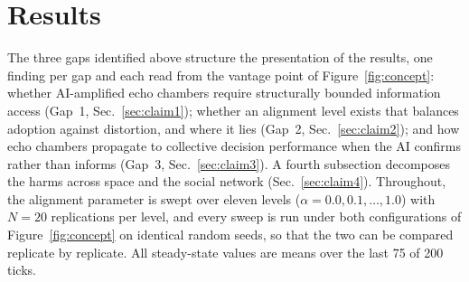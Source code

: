 \documentclass[pdflatex,sn-nature]{sn-jnl}
\begin{document}
\section{Results}\label{sec:results}

The three gaps identified above structure the presentation of the results, one finding per gap and each read from the vantage point of Figure~\ref{fig:concept}: whether AI-amplified echo chambers require structurally bounded information access (Gap~1, Sec.~\ref{sec:claim1}); whether an alignment level exists that balances adoption against distortion, and where it lies (Gap~2, Sec.~\ref{sec:claim2}); and how echo chambers propagate to collective decision performance when the AI confirms rather than informs (Gap~3, Sec.~\ref{sec:claim3}). A fourth subsection decomposes the harms across space and the social network (Sec.~\ref{sec:claim4}). Throughout, the alignment parameter is swept over eleven levels ($\alpha = 0.0, 0.1, \ldots, 1.0$) with $N = 20$ replications per level, and every sweep is run under both configurations of Figure~\ref{fig:concept} on identical random seeds, so that the two can be compared replicate by replicate. All steady-state values are means over the last 75 of 200 ticks.
\end{document}
